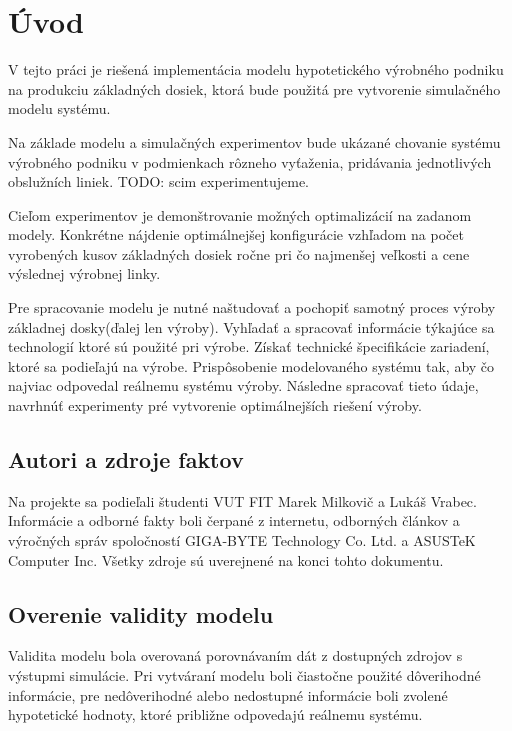 \documentclass[12pt,a4paper,titlepage,final]{article}
\begin{document}
\newpage
\pagestyle{plain}
\setcounter{page}{1}

\section{Úvod}
V tejto práci je riešená implementácia modelu hypotetického výrobného podniku
na produkciu základných dosiek, ktorá bude použitá pre vytvorenie simulačného
modelu systému.

Na základe modelu a simulačných experimentov bude ukázané chovanie systému
výrobného podniku v podmienkach rôzneho vyťaženia, pridávania jednotlivých
obslužních liniek.
TODO: scim experimentujeme. 

Cieľom experimentov je demonštrovanie možných optimalizácií na zadanom modely. Kon\-kré\-tne
nájdenie optimálnejšej konfigurácie vzhľadom na počet vyrobených
kusov základných dosiek ročne pri čo najmenšej veľkosti a cene výslednej 
výrobnej linky.

Pre spracovanie modelu je nutné naštudovať a pochopiť samotný proces výroby
základnej dosky(ďalej len výroby). Vyhľadať a spracovať informácie týkajúce sa 
technologií ktoré sú použité pri výrobe. Získať technické špecifikácie zariadení,
ktoré sa podieľajú na výrobe. Pri\-spô\-so\-be\-nie modelovaného systému tak,
aby čo najviac odpovedal reálnemu
systému výroby. Následne spracovať tieto údaje, navrhnúť experimenty pré 
vytvorenie optimálnejších riešení výroby. 

\subsection{Autori a zdroje faktov}
Na projekte sa podieľali študenti VUT FIT Marek Milkovič a Lukáš Vrabec. Informácie
a odborné fakty boli čerpané z internetu, odborných článkov a výročných
správ spoločností GIGA-BYTE Technology Co. Ltd. a ASUSTeK Computer Inc.
Všetky zdroje sú uverejnené na konci tohto dokumentu.

\subsection{Overenie validity modelu}
Validita modelu bola overovaná porovnávaním dát z dostupných zdrojov s výstupmi
simulácie. Pri vytváraní modelu boli čiastočne použité dôverihodné informácie,
pre nedôverihodné alebo nedostupné informácie boli zvolené hypotetické hodnoty,
ktoré približne odpovedajú reálnemu systému. 
\end{document}
